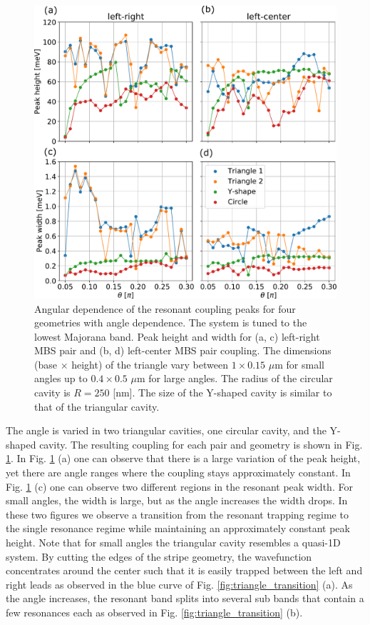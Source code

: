 \begin{figure}[h!]
\centering
  \includegraphics[width=0.78\linewidth]{figures/angles_height_width.pdf}
  \caption{Angular dependence of the resonant coupling peaks for four geometries with angle dependence. The system is tuned to the lowest Majorana band. Peak height and width for (a, c) left-right MBS pair and (b, d) left-center MBS pair coupling. The dimensions (base $\times$ height) of the triangle vary between $1 \times 0.15 $ $\mu$m for small angles up to $0.4 \times 0.5$ $\mu$m for large angles. The radius of the circular cavity is $R=250$ [nm]. The size of the Y-shaped cavity is similar to that of the triangular cavity.}
  \label{fig:angles_couplings}
\end{figure}

The angle is varied in two triangular cavities, one circular cavity, and the Y-shaped cavity.
The resulting coupling for each pair and geometry is shown in Fig. \ref{fig:angles_couplings}.
In Fig. \ref{fig:angles_couplings} (a) one can observe that there is a large variation of the peak height, yet there are angle ranges where the coupling stays approximately constant.
In Fig. \ref{fig:angles_couplings} (c) one can observe two different regions in the resonant peak width.
For small angles, the width is large, but as the angle increases the width drops.
In these two figures we observe a transition from the resonant trapping regime to the single resonance regime while maintaining an approximately constant peak height.
Note that for small angles the triangular cavity resembles a quasi-1D system.
By cutting the edges of the stripe geometry, the wavefunction concentrates around the center such that it is easily trapped between the left and right leads as observed in the blue curve of Fig. \ref{fig:triangle_transition} (a).
As the angle increases, the resonant band splits into several sub bands that contain a few resonances each as observed in Fig. \ref{fig:triangle_transition} (b).

